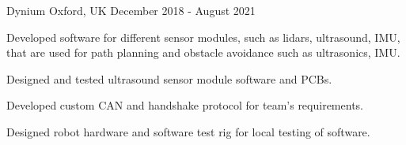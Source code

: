 \begin{cventries}
    {Dynium} %
    {Oxford, UK} %
    {December 2018 - August 2021} %
    {
      \begin{cvitems} %
        \item {Developed software for different sensor modules, such as lidars, ultrasound, IMU, that are used for path planning and obstacle avoidance such
        as ultrasonics, IMU.}
        \item {Designed and tested ultrasound sensor module software and PCBs.}
        \item {Developed custom CAN and handshake protocol for team’s requirements.}
        \item {Designed robot hardware and software test rig for local testing of software.}
      \end{cvitems}
    }

\end{cventries}

